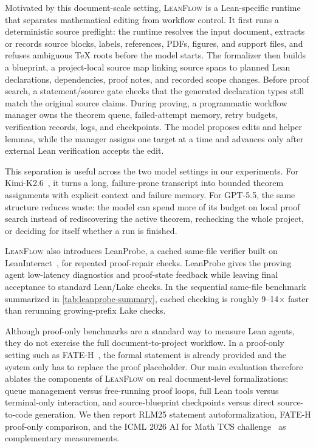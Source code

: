 \documentclass{article}
\newcommand{\method}{\textsc{LeanFlow}\xspace}
\newcommand{\kimi}{Kimi-K2.6\xspace}
\newcommand{\gpt}{GPT-5.5\xspace}
\newcommand{\lean}{Lean\xspace}
\begin{document}
Motivated by this document-scale setting, \method is a \lean-specific runtime that separates mathematical editing from workflow control.
It first runs a deterministic source preflight: the runtime resolves the input document, extracts or records source blocks, labels, references, PDFs, figures, and support files, and refuses ambiguous \TeX{} roots before the model starts.
The formalizer then builds a blueprint, a project-local source map linking source spans to planned \lean declarations, dependencies, proof notes, and recorded scope changes.
Before proof search, a statement/source gate checks that the generated declaration types still match the original source claims.
During proving, a programmatic workflow manager owns the theorem queue, failed-attempt memory, retry budgets, verification records, logs, and checkpoints.
The model proposes edits and helper lemmas, while the manager assigns one target at a time and advances only after external \lean verification accepts the edit.

This separation is useful across the two model settings in our experiments.
For \kimi~\citep{moonshot2026kimi}, it turns a long, failure-prone transcript into bounded theorem assignments with explicit context and failure memory.
For \gpt, the same structure reduces waste: the model can spend more of its budget on local proof search instead of rediscovering the active theorem, rechecking the whole project, or deciding for itself whether a run is finished.

\method also introduces LeanProbe, a cached same-file verifier built on LeanInteract~\citep{leaninteract2025}, for repeated proof-repair checks.
LeanProbe gives the proving agent low-latency diagnostics and proof-state feedback while leaving final acceptance to standard \lean/Lake checks.
In the sequential same-file benchmark summarized in \cref{tab:leanprobe-summary}, cached checking is roughly 9--14$\times$ faster than rerunning growing-prefix Lake checks.

Although proof-only benchmarks are a standard way to measure \lean agents, they do not exercise the full document-to-project workflow.
In a proof-only setting such as FATE-H~\citep{jiang2025fate}, the formal statement is already provided and the system only has to replace the proof placeholder.
Our main evaluation therefore ablates the components of \method on real document-level formalizations: queue management versus free-running proof loops, full \lean tools versus terminal-only interaction, and source-blueprint checkpoints versus direct source-to-code generation.
We then report RLM25 statement autoformalization, FATE-H proof-only comparison, and the ICML 2026 AI for Math TCS challenge~\citep{ai4math2026challenge} as complementary measurements.
\end{document}
